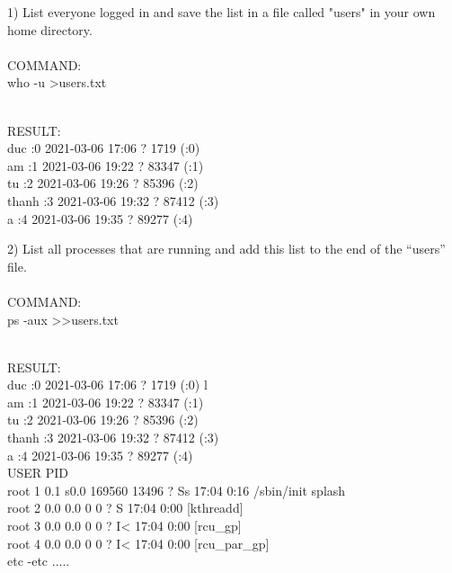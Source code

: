 \documentclass{article}
\begin{document}
\begin{tcolorbox}
1) List everyone logged in and save the list in a file called "users" in your own home directory.
\\
\\COMMAND:
\\who -u \textgreater users.txt
\end{tcolorbox}

\begin{tcolorbox}
\\RESULT:
\\duc       :0             2021-03-06 17:06   ?          1719 (:0)
\\am        :1             2021-03-06 19:22   ?          83347 (:1)
\\tu          :2             2021-03-06 19:26   ?          85396 (:2)
\\thanh     :3             2021-03-06 19:32   ?          87412 (:3)
\\a           :4             2021-03-06 19:35   ?          89277 (:4)
\end{tcolorbox}

\begin{tcolorbox}
2) List all processes that are running and add this list to the end of the “users” file.
\\
\\COMMAND:
\\ps -aux \textgreater \textgreater users.txt
\end{tcolorbox}

\begin{tcolorbox}
\\RESULT:
\\duc      :0           2021-03-06 17:06   ?          1719 (:0)
l\\am      :1           2021-03-06 19:22   ?         83347 (:1)
\\tu       :2           2021-03-06 19:26   ?         85396 (:2)
\\thanh    :3           2021-03-06 19:32   ?         87412 (:3)
\\a        :4           2021-03-06 19:35   ?         89277 (:4)
\\USER         PID %
\\root           1  0.1  s0.0 169560 13496 ?        Ss   17:04   0:16 /sbin/init splash
\\root           2  0.0  0.0      0     0 ?        S    17:04   0:00 [kthreadd]
\\root           3  0.0  0.0      0     0 ?        I<   17:04   0:00 [rcu_gp]
\\root           4  0.0  0.0      0     0 ?        I<   17:04   0:00 [rcu_par_gp]
\\etc -etc .....
\end{tcolorbox}
\end{document}
